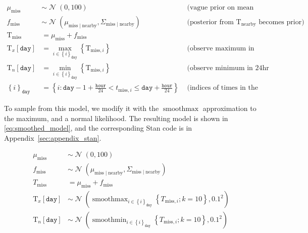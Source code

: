 \documentclass[letter]{article}
\def\lt{<}
\newcommand{\genericdel}[3]{%
      \left#1#3\right#2
    }
\newcommand{\del}[1]{\genericdel(){#1}}
\newcommand{\sbr}[1]{\genericdel[]{#1}}
\newcommand{\cbr}[1]{\genericdel\{\}{#1}}
\DeclareMathOperator{\normal}{\mathcal{N}}
\newcommand{\T}{\mathrm{T}}
\newcommand{\Tn}{\T_{n}}
\newcommand{\Tx}{\T_{x}}
\newcommand{\miss}{\mathrm{miss}}
\newcommand{\obs}{\mathrm{nearby}}
\newcommand{\hour}{\mathtt{hour}}
\DeclareMathOperator*{\softmax}{smoothmax}
\DeclareMathOperator*{\softmin}{smoothmin}
\newcommand{\iday}{\mathtt{day}}
\newcommand{\dayset}[1]{\cbr{i}_{#1}}
\newcommand{\eqlabel}[1]{\label{#1}}
\begin{document}
\begin{equation}
\begin{aligned}
    \mu_{\miss} &\sim \normal\del{0,100} & \text{ (vague prior on mean temperature)} \\
    f_\miss &\sim \normal\del{\mu_{\miss \mid \obs}, \Sigma_{\miss \mid \obs}} & \text{ (posterior from $\T_\obs$ becomes prior)} \\
    \T_\miss &= \mu_\miss + f_\miss \\
    \Tx\sbr{\iday} &= \max_{i \in \dayset{\iday}}\cbr{ \T_{\miss,i}} & \text{ (observe maximum in 24hr window)}\\
    \Tn\sbr{\iday} &= \min_{i \in \dayset{\iday}}\cbr{ \T_{\miss,i}} & \text{ (observe minimum in 24hr window)}\\
    \dayset{\iday} &= \cbr{i : \iday-1+\frac{\hour}{24} \lt t_{\miss,i} \le \iday + \frac{\hour}{24}} & \text{ (indices of times in the 24hr window)}
\end{aligned}
\eqlabel{eq:idealmodel}
\end{equation}
    


        To sample from this model, we modify it with the \(\softmax\) approximation to the maximum, and a normal likelihood. The resulting model is shown in \eqref{eq:smoothed_model}, and the corresponding Stan code is in Appendix~\ref{sec:appendix_stan}.

\begin{equation}
\begin{split}
    \mu_\miss &\sim \normal\del{0,100} \\
    f_\miss &\sim \normal\del{\mu_{\miss \mid \obs}, \Sigma_{\miss \mid \obs}} \\
    T_\miss &= \mu_\miss + f_\miss \\
    \Tx\sbr{\iday} &\sim \normal\del{\softmax_{i \in \dayset{\iday}} \cbr{ T_{\miss,i}; k=10}, 0.1^2} \\
    \Tn\sbr{\iday} &\sim \normal\del{\softmin_{i \in \dayset{\iday}} \cbr{ T_{\miss,i}; k=10}, 0.1^2}
\end{split}
\eqlabel{eq:smoothed_model}
\end{equation}
    
\end{document}
